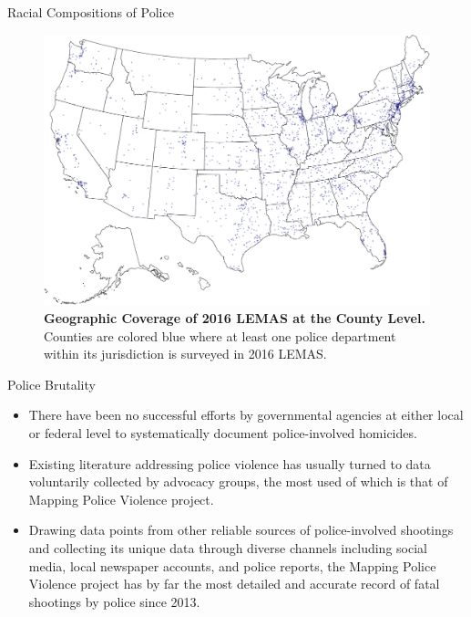 \documentclass[
  10pt,
  ignorenonframetext,
]{beamer}
\begin{document}
\begin{frame}{Racial Compositions of Police}
\protect\hypertarget{racial-compositions-of-police}{}
\begin{figure}

{\centering \includegraphics{slides_files/figure-beamer/fig-lemas-cover-1.pdf}

}

\caption{\label{fig-lemas-cover}\textbf{Geographic Coverage of 2016
LEMAS at the County Level.} Counties are colored blue where at least one
police department within its jurisdiction is surveyed in 2016 LEMAS.}

\end{figure}
\end{frame}

\begin{frame}{Police Brutality}
\protect\hypertarget{police-brutality}{}
\begin{itemize}
\item
  There have been no successful efforts by governmental agencies at
  either local or federal level to systematically document
  police-involved homicides.
\item
  Existing literature addressing police violence has usually turned to
  data voluntarily collected by advocacy groups, the most used of which
  is that of Mapping Police Violence project.
\item
  Drawing data points from other reliable sources of police-involved
  shootings and collecting its unique data through diverse channels
  including social media, local newspaper accounts, and police reports,
  the Mapping Police Violence project has by far the most detailed and
  accurate record of fatal shootings by police since 2013.
\end{itemize}
\end{frame}
\end{document}
